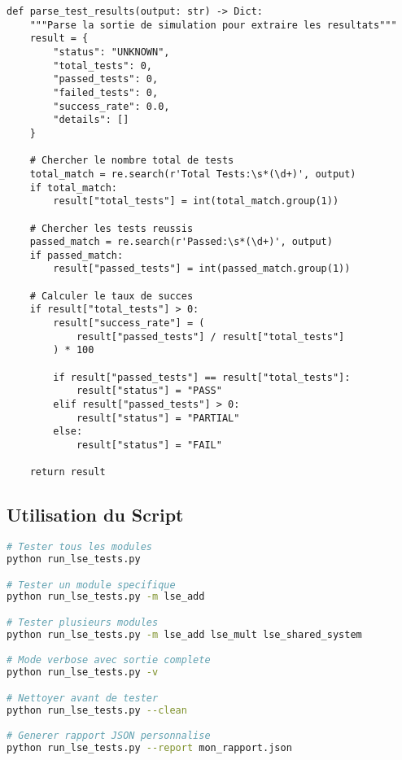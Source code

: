 \documentclass[12pt,a4paper]{article}
\begin{document}
\begin{lstlisting}[style=python, caption={Extraction des résultats de simulation}]
def parse_test_results(output: str) -> Dict:
    """Parse la sortie de simulation pour extraire les resultats"""
    result = {
        "status": "UNKNOWN",
        "total_tests": 0,
        "passed_tests": 0,
        "failed_tests": 0,
        "success_rate": 0.0,
        "details": []
    }
    
    # Chercher le nombre total de tests
    total_match = re.search(r'Total Tests:\s*(\d+)', output)
    if total_match:
        result["total_tests"] = int(total_match.group(1))
    
    # Chercher les tests reussis
    passed_match = re.search(r'Passed:\s*(\d+)', output)
    if passed_match:
        result["passed_tests"] = int(passed_match.group(1))
    
    # Calculer le taux de succes
    if result["total_tests"] > 0:
        result["success_rate"] = (
            result["passed_tests"] / result["total_tests"]
        ) * 100
        
        if result["passed_tests"] == result["total_tests"]:
            result["status"] = "PASS"
        elif result["passed_tests"] > 0:
            result["status"] = "PARTIAL"
        else:
            result["status"] = "FAIL"
    
    return result
\end{lstlisting}

\subsection{Utilisation du Script}

\begin{lstlisting}[language=bash, caption={Commandes disponibles}]
# Tester tous les modules
python run_lse_tests.py

# Tester un module specifique
python run_lse_tests.py -m lse_add

# Tester plusieurs modules
python run_lse_tests.py -m lse_add lse_mult lse_shared_system

# Mode verbose avec sortie complete
python run_lse_tests.py -v

# Nettoyer avant de tester
python run_lse_tests.py --clean

# Generer rapport JSON personnalise
python run_lse_tests.py --report mon_rapport.json
\end{lstlisting}

\end{document}
